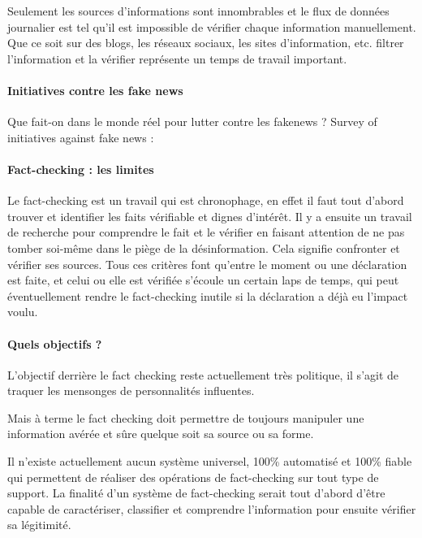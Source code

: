 Seulement les sources d'informations sont innombrables et le flux de données journalier est tel qu'il est impossible de vérifier chaque information manuellement. Que ce soit sur des blogs, les réseaux sociaux, les sites d'information, etc. filtrer l'information et la vérifier représente un temps de travail important.


\paragraph{Initiatives contre les fake news}

Que fait-on dans le monde réel pour lutter contre les fakenews ?
Survey of initiatives against fake news : \cite{haciyakupoglu2018countering}


\paragraph{Fact-checking : les limites}

Le fact-checking est un travail qui est chronophage, en effet il faut tout d'abord trouver et identifier les faits vérifiable et dignes d'intérêt. Il y a ensuite un travail de recherche pour comprendre le fait et le vérifier en faisant attention de ne pas tomber soi-même dans le piège de la désinformation. Cela signifie confronter et vérifier ses sources. 
Tous ces critères font qu'entre le moment ou une déclaration est faite, et celui ou elle est vérifiée s'écoule un certain laps de temps, qui peut éventuellement rendre le fact-checking inutile si la déclaration a déjà eu l'impact voulu.

\paragraph{Quels objectifs ?}

L'objectif derrière le fact checking reste actuellement très politique, il s'agit de traquer les mensonges de personnalités influentes.

Mais à terme le fact checking doit permettre de toujours manipuler une information avérée et sûre quelque soit sa source ou sa forme.

Il n'existe actuellement aucun système universel, 100\% automatisé et 100\% fiable qui permettent de réaliser des opérations de fact-checking sur tout type de support. La finalité d'un système de fact-checking serait tout d'abord d'être capable de caractériser, classifier et comprendre l'information pour ensuite vérifier sa légitimité. 

